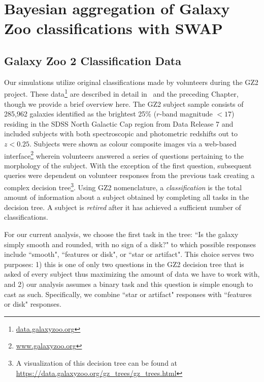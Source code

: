 
\chapter{Bayesian aggregation of Galaxy Zoo classifications with SWAP}
\label{chap:3}



\section{Galaxy Zoo 2 Classification Data} \label{sec: data}

Our simulations utilize original classifications made by volunteers during the GZ2 project. These data\footnote{\url{data.galaxyzoo.org}} are described in detail in~\cite{Willett2013} and the preceding Chapter, though we provide a brief overview here.  The GZ2 subject sample consists of 285,962 galaxies identified as the brightest 25\% ($r$-band magnitude $< 17$) residing in the SDSS North Galactic Cap region from Data Release 7 and included subjects with both spectroscopic and photometric redshifts out to $z < 0.25$. Subjects were shown as colour composite images via a web-based interface\footnote{\url{www.galaxyzoo.org}} wherein volunteers answered a series of questions pertaining to the morphology of the subject. With the exception of the first question, subsequent queries were dependent on volunteer responses from the previous task creating a complex decision tree\footnote{A visualization of this decision tree can be found at \url{https://data.galaxyzoo.org/gz_trees/gz_trees.html}}. Using GZ2 nomenclature, a \textit{classification} is the total amount of information about a subject obtained by completing all tasks in the decision tree. A subject is \textit{retired} after it has achieved a sufficient number of classifications.


For our current analysis, we choose the first task in the tree: ``Is the galaxy simply smooth and rounded, with no sign of a disk?" to which possible responses include ``smooth", ``features or disk", or ``star or artifact". This choice serves two purposes: 1) this is one of only two questions in the GZ2 decision tree that is asked of every subject thus maximizing the amount of data we have to work with, and 2) our analysis assumes a binary task and this question is simple enough to cast as such. Specifically, we combine ``star or artifact" responses with ``features or disk" responses.

